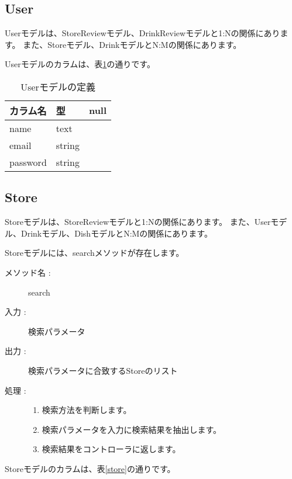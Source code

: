 \documentclass[a4j,titlepage]{jarticle}
\begin{document}
\subsection{User}
Userモデルは、StoreReviewモデル、DrinkReviewモデルと1:Nの関係にあります。
また、Storeモデル、DrinkモデルとN:Mの関係にあります。

Userモデルのカラムは、表\ref{user}の通りです。

\begin{table}[!htbp]
\caption{Userモデルの定義}
\label{user}
\small
\begin{center}
\begin{tabular}{|l|l|c|}\hline
カラム名 & 型 & null \\\hline\hline
name & text & \\\hline
email & string & \\\hline
password & string & \\\hline
\end{tabular}
\end{center}
\end{table}

\subsection{Store}
Storeモデルは、StoreReviewモデルと1:Nの関係にあります。
また、Userモデル、Drinkモデル、DishモデルとN:Mの関係にあります。

Storeモデルには、searchメソッドが存在します。

\begin{description}
\item [メソッド名 :] search
\item [入力 :] 検索パラメータ
\item [出力 :] 検索パラメータに合致するStoreのリスト
\item [処理 :]\mbox{}
  \begin{enumerate}
  \item 検索方法を判断します。
  \item 検索パラメータを入力に検索結果を抽出します。
  \item 検索結果をコントローラに返します。
  \end{enumerate}
\end{description}

Storeモデルのカラムは、表\ref{store}の通りです。
\end{document}

